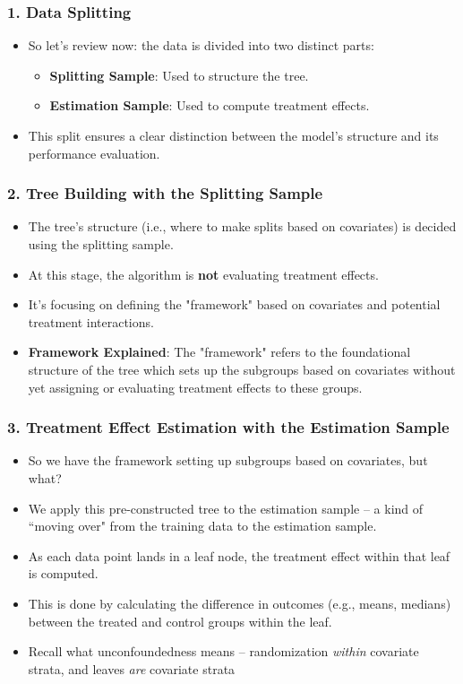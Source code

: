 \documentclass{beamer}
\begin{document}
\begin{frame}
\frametitle{1. Data Splitting}

\begin{itemize}
    \item So let's review now: the data is divided into two distinct parts:
    \begin{itemize}
        \item \textbf{Splitting Sample}: Used to structure the tree.
        \item \textbf{Estimation Sample}: Used to compute treatment effects.
    \end{itemize}
    \item This split ensures a clear distinction between the model's structure and its performance evaluation.
\end{itemize}
\end{frame}

\begin{frame}
\frametitle{2. Tree Building with the Splitting Sample}
\begin{itemize}
    \item The tree's structure (i.e., where to make splits based on covariates) is decided using the splitting sample.
    \item At this stage, the algorithm is \textbf{not} evaluating treatment effects.
    \item It's focusing on defining the "framework" based on covariates and potential treatment interactions.
    \item \textbf{Framework Explained}: The "framework" refers to the foundational structure of the tree which sets up the subgroups based on covariates without yet assigning or evaluating treatment effects to these groups.
\end{itemize}
\end{frame}

\begin{frame}
\frametitle{3. Treatment Effect Estimation with the Estimation Sample}
\begin{itemize}
	\item So we have the framework setting up subgroups based on covariates, but what? 
    \item We apply this pre-constructed tree to the estimation sample -- a kind of ``moving over" from the training data to the estimation sample.
    \item As each data point lands in a leaf node, the treatment effect within that leaf is computed.
    \item This is done by calculating the difference in outcomes (e.g., means, medians) between the treated and control groups within the leaf.
    \item Recall what unconfoundedness means -- randomization \emph{within} covariate strata, and leaves \emph{are} covariate strata
\end{itemize}
\end{frame}
\end{document}
